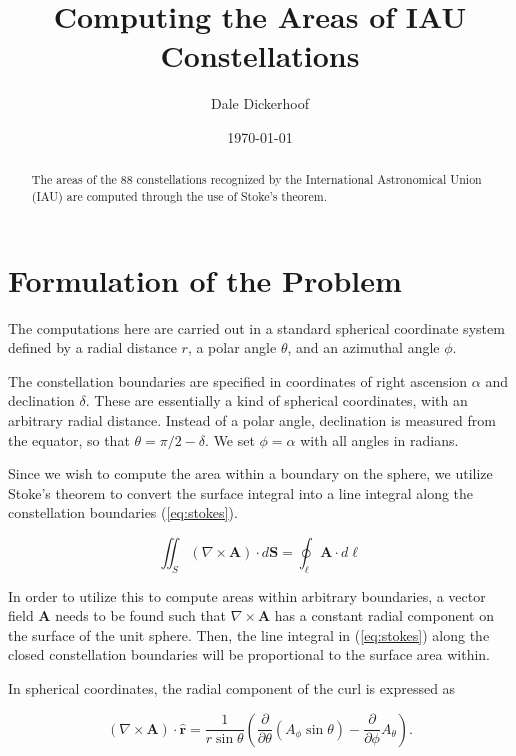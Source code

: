 \documentclass[11pt]{article}
\title{Computing the Areas of IAU Constellations}
\author{Dale Dickerhoof}
\date{\today}
\newcommand{\bvec}[1]{\bm{#1}}
\begin{document}
\maketitle

\begin{abstract}
The areas of the 88 constellations recognized by the International Astronomical Union (IAU) are computed
through the use of Stoke's theorem.
\end{abstract}

\section{Formulation of the Problem}

The computations here are carried out in a standard spherical coordinate system defined by a radial distance $r$, a polar angle $\theta$,
and an azimuthal angle $\phi$.

The constellation boundaries are specified in coordinates of right ascension $\alpha$ and declination $\delta$. These are
essentially a kind of spherical coordinates, with an arbitrary radial distance.  Instead of a polar angle, declination is
measured from the equator, so that $\theta=\pi/2 - \delta$.  We set $\phi=\alpha$ with all angles in radians.

Since we wish to compute the area within a boundary on the sphere, we utilize Stoke's theorem to convert the surface integral
into a line integral along the constellation boundaries (\ref{eq:stokes}).

\begin{equation}
	\iint_S \left( \nabla \times \bvec{A} \right) \cdot d\bvec{S} = \oint_\ell \bvec{A} \cdot d\bvec{\ell}
	\label{eq:stokes}
\end{equation}

In order to utilize this to compute areas within arbitrary boundaries, a vector field $\bvec{A}$ needs to be found such that
$\nabla \times \bvec{A}$ has a constant radial component on the surface of the unit sphere.  Then, the line integral in
(\ref{eq:stokes}) along the closed constellation boundaries will be proportional to the surface area within.

In spherical coordinates, the radial component of the curl is expressed as

\begin{equation}
	\left( \nabla \times \bvec{A}  \right) \cdot \bvec{\hat{r}} = \frac{1}{r \sin\theta}
		\left(
			\frac{\partial}{\partial \theta} \left( A_\phi \sin\theta \right) - \frac{\partial}{\partial\phi}A_\theta
		\right).
	\label{eq:radialcurl}
\end{equation}
\end{document}
